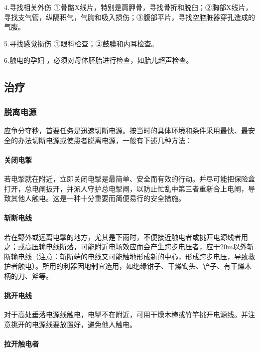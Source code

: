 4.寻找相关外伤
①骨骼X线片，特别是肩胛骨，寻找骨折和脱臼；②胸部X线片，寻找支气管，纵隔积气，气胸和吸入损伤；③腹部平片，寻找空腔脏器穿孔造成的气腹。

5.寻找感觉损伤 ①眼科检查；②鼓膜和内耳检查。

6.触电的孕妇 ，必须对母体胚胎进行检查，如胎儿超声检查。

\subsection{治疗}

\subsubsection{脱离电源}

应争分夺秒，首要任务是迅速切断电源。按当时的具体环境和条件采用最快、最安全的办法切断电源或使患者脱离电源，一般有下述几种方法：

\paragraph{关闭电掣}

若电掣就在附近，立即关闭电掣是最简单、安全而有效的行动。并尽可能把保险盒打开，总电闸扳开，并派人守护总电掣闸，以防止忙乱中第三者重新合上电闸，导致其他人触电。这是一种十分重要而简便易行的安全措施。

\paragraph{斩断电线}

若在野外或远离电掣的地方，尤其是下雨时，不便接近触电者或挑开电源线者用之；或高压输电线断落，可能附近电场效应而会产生跨步电压者，应于20m以外斩断输电线（注意：斩断端的电线又可能触地形成新的中心，形成跨步电压，导致救护者触电）。所用的利器因地制宜选用，如绝缘钳子、干燥锄头、铲子、有干燥木柄的刀、斧等。

\paragraph{挑开电线}

对于高处垂落电源线触电，电掣不在附近，可用干燥木棒或竹竿挑开电源线。并注意挑开的电源线要放置好，避免他人触电。

\paragraph{拉开触电者}


